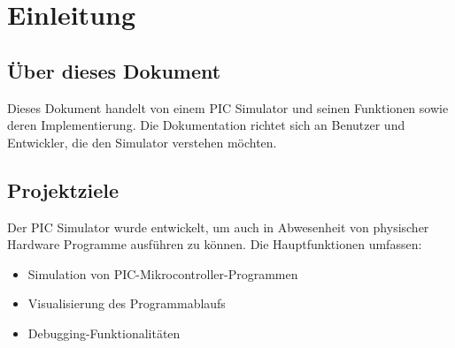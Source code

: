 \chapter{Einleitung}

\section{Über dieses Dokument}
Dieses Dokument handelt von einem PIC Simulator und seinen Funktionen sowie deren Implementierung. Die Dokumentation richtet sich an Benutzer und Entwickler, die den Simulator verstehen möchten.

\section{Projektziele}
Der PIC Simulator wurde entwickelt, um auch in Abwesenheit von physischer Hardware Programme ausführen zu können. Die Hauptfunktionen umfassen:

\begin{itemize}
    \item Simulation von PIC-Mikrocontroller-Programmen
    \item Visualisierung des Programmablaufs
    \item Debugging-Funktionalitäten
\end{itemize}
